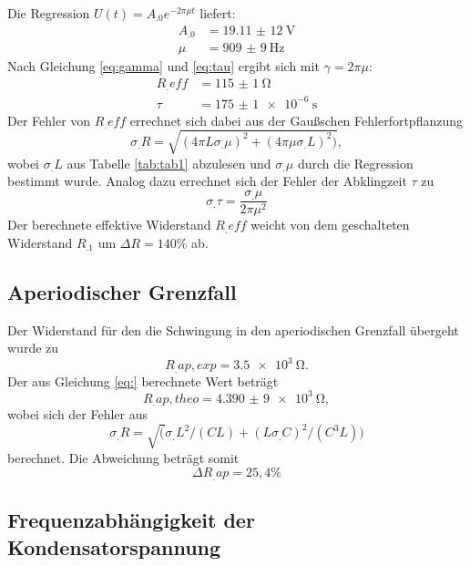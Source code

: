 \newpage
\noindent Die Regression $U(t)=A_.0e^{-2\pi\mu t}$ liefert:
\begin{align}
A_.0 &= \SI{19,11(12)}{\volt} \\
\mu &= \SI{909(9)}{\hertz}
\end{align}
Nach Gleichung \eqref{eq:gamma} und \eqref{eq:tau} ergibt sich mit $\gamma=2\pi\mu$:
\begin{align}
R_.{eff}&=\SI{115(1)}{\ohm} \\
\tau &=\SI{175(1)e-6}{\second}
\end{align}
Der Fehler von $R_.{eff}$ errechnet sich dabei aus der Gaußschen Fehlerfortpflanzung
\[
\sigma_.R=\sqrt{(4\pi L\sigma_.{\mu})^2 +(4\pi\mu\sigma_.L)^2)},
\]
wobei $\sigma_.L$ aus Tabelle \ref{tab:tab1} abzulesen und $\sigma_.{\mu}$ durch die Regression bestimmt wurde.
Analog dazu errechnet sich der Fehler der Abklingzeit $\tau$ zu
\[
\sigma_.{\tau}=\frac{\sigma_.{\mu}}{2\pi\mu^2}
\]
Der berechnete effektive Widerstand $R_.{eff}$ weicht von dem geschalteten Widerstand $R_.1$ um $\Delta R=140\%$ ab.
\subsection{Aperiodischer Grenzfall}
Der Widerstand für den die Schwingung in den aperiodischen Grenzfall übergeht wurde zu
\[
R_.{ap,exp}=\SI{3,5e3}{\ohm}\text{.}
\]
Der aus Gleichung \eqref{eq:} berechnete Wert beträgt
\[
R_.{ap,theo}=\SI{4,390(9)e3}{\ohm},
\]
wobei sich der Fehler aus
\[
\sigma_.{R}=\sqrt(\sigma_.L^2/(CL)+(L\sigma_.C)^2/(C^3L))
\]
berechnet.\newline
Die Abweichung beträgt somit
\[
\Delta R_.{ap}=25,4\%
\]
\subsection{Frequenzabhängigkeit der Kondensatorspannung}
